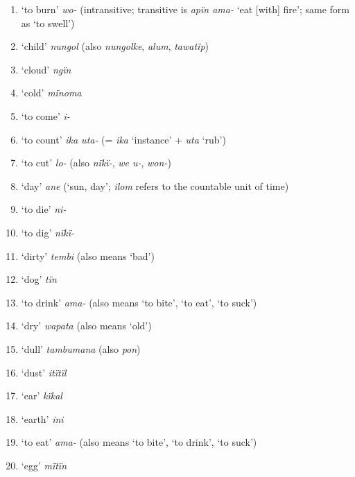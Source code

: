 \begin{enumerate}[noitemsep, label={\arabic*}, align=left, widest=190, labelsep=1ex,leftmargin=*]
\item ‘to burn’ \textit{wo-} (intransitive; transitive is \textit{apïn ama-} ‘eat [with] fire’; same form as ‘to swell’)

\item ‘child’ \textit{nungol} (also \textit{nungolke}, \textit{alum}, \textit{tawatïp})

\item ‘cloud’ \textit{ngïn}

\item ‘cold’ \textit{mïnoma}

\item ‘to come’ \textit{i-}

\item ‘to count’ \textit{ika uta-} (= \textit{ika} ‘instance’ + \textit{uta} ‘rub’)

\item ‘to cut’ \textit{lo-} (also \textit{nïkï-}, \textit{we u-}, \textit{won-})

\item ‘day’ \textit{ane} (‘sun, day’; \textit{ilom} refers to the countable unit of time)

\item ‘to die’ \textit{ni-}

\item ‘to dig’ \textit{nïkï-}

\item ‘dirty’ \textit{tembi} (also means ‘bad’)

\item ‘dog’ \textit{tïn}

\item ‘to drink’ \textit{ama-} (also means ‘to bite’, ‘to eat’, ‘to suck’)

\item ‘dry’ \textit{wapata} (also means ‘old’)

\item ‘dull’ \textit{tambumana} (also \textit{pon})

\item ‘dust’ \textit{itïtïl}

\item ‘ear’ \textit{kïkal}

\item ‘earth’ \textit{ini}

\item ‘to eat’ \textit{ama-} (also means ‘to bite’, ‘to drink’, ‘to suck’)

\item ‘egg’ \textit{mïtïn}


\end{enumerate}
